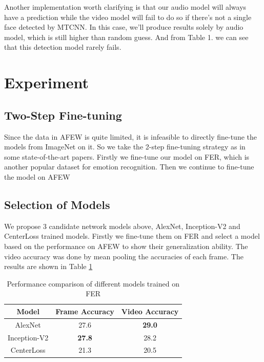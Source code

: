 \documentclass[10pt,twocolumn,letterpaper]{article}
\begin{document}
Another implementation worth clarifying is that our audio model will always have a prediction while the video model will fail to do so if there's not a single face detected by MTCNN. In this case, we'll produce results solely by audio model, which is still higher than random guess. And from Table 1. we can see that this detection model rarely fails. 

\section{Experiment}

\subsection{Two-Step Fine-tuning}

Since the data in AFEW is quite limited, it is infeasible to directly fine-tune the models from ImageNet on it. So we take the 2-step fine-tuning strategy as in some state-of-the-art papers. Firstly we fine-tune our model on FER, which is another popular dataset for emotion recognition. Then we continue to fine-tune the model on AFEW

\subsection{Selection of Models}

We propose 3 candidate network models above, AlexNet, Inception-V2 and CenterLoss trained models. Firstly we fine-tune them on FER and select a model based on the performance on AFEW to show their generalization ability. The video accuracy was done by mean pooling the accuracies of each frame. The results are shown in Table \ref{tableSel}


\begin{table}[t]
\begin{center}
\vspace*{5pt}
\begin{tabular}{|c|c|c|}
\hline
\textbf{Model} & \textbf{Frame Accuracy} & \textbf{Video Accuracy} \\
\hline\hline
AlexNet & 27.6 & \textbf{29.0} \\
Inception-V2 & \textbf{27.8} & 28.2 \\
CenterLoss & 21.3 & 20.5 \\ 
\hline
\end{tabular}
\end{center}
\caption{Performance comparison of different models trained on FER}
\label{tableSel}

\end{table}
\end{document}
